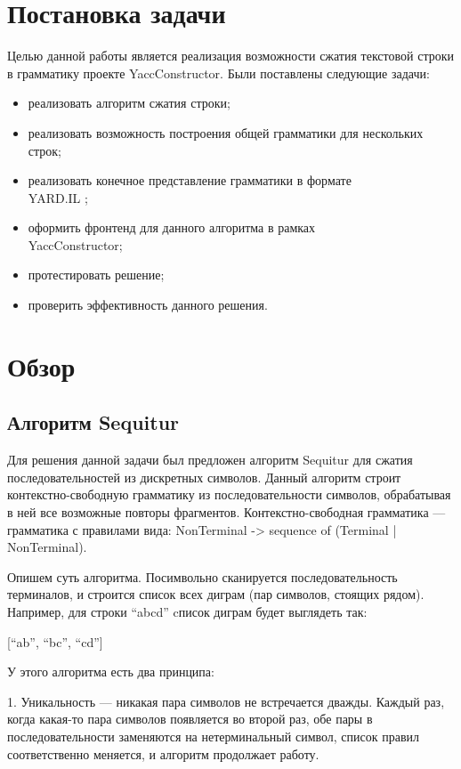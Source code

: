 \documentclass[14pt]{matmex-diploma}
\begin{document}
\section{Постановка задачи}
    Целью данной работы является реализация возможности сжатия текстовой строки в грамматику проекте YaccConstructor. 
    Были поставлены следующие задачи:
    \begin{itemize}
        \item реализовать алгоритм сжатия строки;
        \item реализовать возможность построения общей грамматики для нескольких строк;  
        \item реализовать конечное представление грамматики в формате \\YARD.IL \cite{YARD};
        \item оформить фронтенд для данного алгоритма в рамках \\YaccConstructor;
        \item протестировать решение;
        \item проверить эффективность данного решения.
    \end{itemize}
    
\section{Обзор}
	\subsection{Алгоритм Sequitur}
	Для решения данной задачи был предложен алгоритм Sequitur \cite{sequitur} для сжатия последовательностей из дискретных символов. Данный алгоритм строит контекстно-свободную грамматику из последовательности символов, обрабатывая в ней все возможные повторы фрагментов. Контекстно-свободная грамматика --- грамматика с правилами вида: NonTerminal -> sequence of (Terminal | NonTerminal). 
	
	Опишем суть алгоритма.
	Посимвольно сканируется последовательность терминалов, и строится список всех диграм (пар символов, стоящих рядом).
	Например, для строки “abcd” cписок диграм будет выглядеть так:
	
	[“ab”, “bc”, “cd”]

    У этого алгоритма есть два принципа:

    1. Уникальность --- никакая пара символов не встречается дважды. Каждый раз, когда какая-то пара символов появляется во второй раз, обе пары в последовательности заменяются на нетерминальный символ, список правил соответственно меняется, и алгоритм продолжает работу. 
\end{document}
